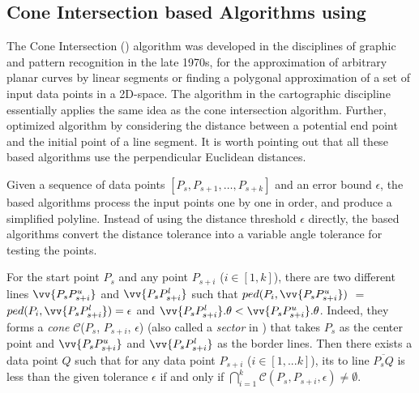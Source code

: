 \subsection{Cone Intersection based Algorithms using \ped}
\label{sub-ci-ped}


The Cone Intersection (\cia) algorithm \cite{Williams:Longest, Sklansky:Cone} was developed in the disciplines of graphic and pattern recognition in the late 1970s, for the approximation of arbitrary planar curves by linear segments or finding a polygonal approximation of a set of input data points in a 2D-space. The \sleeve algorithm \cite{Zhao:Sleeve} in the cartographic discipline essentially applies the same idea as the cone intersection algorithm.
Further, \cite{Dunham:Cone}  optimized algorithm \cia by considering the distance between a potential end point and the initial point of a line segment. It is worth pointing out that all these \cia based algorithms use the perpendicular Euclidean distances.


Given a sequence of data points $[P_{s}, P_{s+1}, \ldots, P_{s+k}]$ and an error bound $\epsilon$, the \cia based algorithms process the input points one by one in order, and produce a simplified polyline.  Instead of using the distance threshold $\epsilon$ directly, the \cia based algorithms convert the distance tolerance into a variable angle tolerance for testing the points.

For the start point $P_s$ and any point $P_{s+i}$ ($i\in[1, k]$), there are two different lines $\vv{P_sP^u_{s+i}}$ and $\vv{P_sP^l_{s+i}}$ such that $ped(P_i, \vv{P_sP^u_{s+i}})$ $=$ $ped(P_i, \vv{P_sP^l_{s+i}}) = \epsilon$ and $\vv{P_sP^l_{s+i}}.\theta < \vv{P_sP^u_{s+i}}.\theta$. Indeed, they forms a \emph{cone} $\mathcal{C}$($P_s$, $P_{s+i}$, $\epsilon$) (also called a \emph{sector} in \sleeve \cite{Zhao:Sleeve}) that takes $P_s$ as the center point and $\vv{P_sP^u_{s+i}}$ and $\vv{P_sP^l_{s+i}}$ as the border lines.
Then there exists a data point $Q$ such that for any data point $P_{s+i}$ ($i \in [1, ... k]$), its \ped to
line $\overline{P_sQ}$ is less than the given \ped tolerance $\epsilon$ if and only if $\bigcap_{i=1}^{k}\mathcal{C}(P_s, P_{s+i}, \epsilon) \ne \emptyset$.

